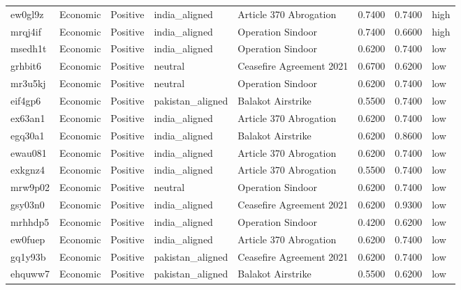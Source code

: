 \begin{longtable}{lllllrrl}
ew0gl9z & Economic & Positive & india\_aligned & Article 370 Abrogation & 0.7400 & 0.7400 & high \\
mrqj4if & Economic & Positive & india\_aligned & Operation Sindoor & 0.7400 & 0.6600 & high \\
msedh1t & Economic & Positive & india\_aligned & Operation Sindoor & 0.6200 & 0.7400 & low \\
grhbit6 & Economic & Positive & neutral & Ceasefire Agreement 2021 & 0.6700 & 0.6200 & low \\
mr3u5kj & Economic & Positive & neutral & Operation Sindoor & 0.6200 & 0.7400 & low \\
eif4gp6 & Economic & Positive & pakistan\_aligned & Balakot Airstrike & 0.5500 & 0.7400 & low \\
ex63an1 & Economic & Positive & india\_aligned & Article 370 Abrogation & 0.6200 & 0.7400 & low \\
egq30a1 & Economic & Positive & india\_aligned & Balakot Airstrike & 0.6200 & 0.8600 & low \\
ewau081 & Economic & Positive & india\_aligned & Article 370 Abrogation & 0.6200 & 0.7400 & low \\
exkgnz4 & Economic & Positive & india\_aligned & Article 370 Abrogation & 0.5500 & 0.7400 & low \\
mrw9p02 & Economic & Positive & neutral & Operation Sindoor & 0.6200 & 0.7400 & low \\
gsy03n0 & Economic & Positive & india\_aligned & Ceasefire Agreement 2021 & 0.6200 & 0.9300 & low \\
mrhhdp5 & Economic & Positive & india\_aligned & Operation Sindoor & 0.4200 & 0.6200 & low \\
ew0fuep & Economic & Positive & india\_aligned & Article 370 Abrogation & 0.6200 & 0.7400 & low \\
gq1y93b & Economic & Positive & pakistan\_aligned & Ceasefire Agreement 2021 & 0.6200 & 0.7400 & low \\
ehquww7 & Economic & Positive & pakistan\_aligned & Balakot Airstrike & 0.5500 & 0.6200 & low \\
\end{longtable}

